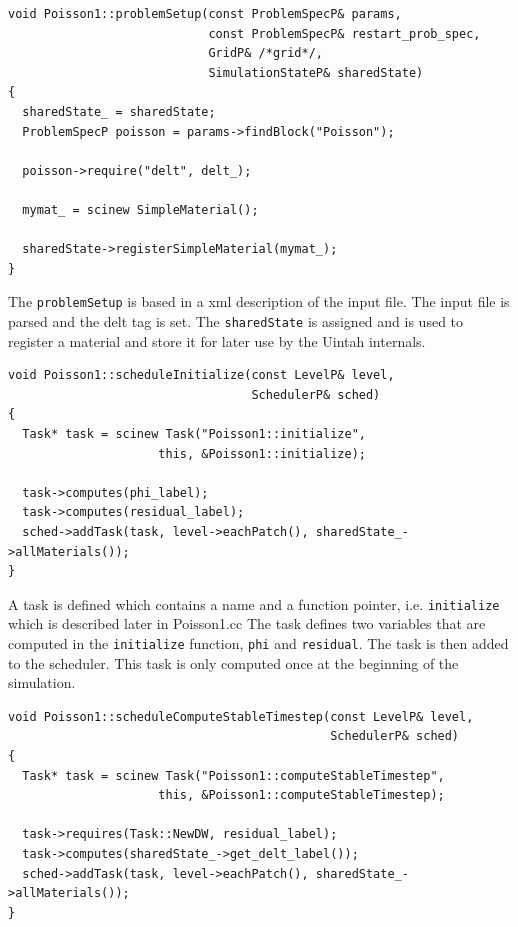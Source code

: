 \documentclass[12pt]{report}
\begin{document}
\begin{Verbatim}[fontsize=\footnotesize]
void Poisson1::problemSetup(const ProblemSpecP& params,
                            const ProblemSpecP& restart_prob_spec,
                            GridP& /*grid*/,
                            SimulationStateP& sharedState)
{
  sharedState_ = sharedState;
  ProblemSpecP poisson = params->findBlock("Poisson");

  poisson->require("delt", delt_);

  mymat_ = scinew SimpleMaterial();

  sharedState->registerSimpleMaterial(mymat_);
}
\end{Verbatim}

The \texttt{problemSetup} is based in a xml description of the input
file.  The input file is parsed and the delt tag is set.  The
\texttt{sharedState} is assigned and is used to register a material
and store it for later use by the Uintah internals.

\begin{Verbatim}[fontsize=\footnotesize]
void Poisson1::scheduleInitialize(const LevelP& level,
                                  SchedulerP& sched)
{
  Task* task = scinew Task("Poisson1::initialize",
                     this, &Poisson1::initialize);

  task->computes(phi_label);
  task->computes(residual_label);
  sched->addTask(task, level->eachPatch(), sharedState_->allMaterials());
}
\end{Verbatim}

A task is defined which contains a name and a function pointer,
i.e. \texttt{initialize} which is described later in Poisson1.cc The
task defines two variables that are computed in the
\texttt{initialize} function, \texttt{phi} and \texttt{residual}.  The
task is then added to the scheduler.  This task is only computed once
at the beginning of the simulation.

\begin{Verbatim}[fontsize=\footnotesize]
void Poisson1::scheduleComputeStableTimestep(const LevelP& level,
                                             SchedulerP& sched)
{
  Task* task = scinew Task("Poisson1::computeStableTimestep",
                     this, &Poisson1::computeStableTimestep);

  task->requires(Task::NewDW, residual_label);
  task->computes(sharedState_->get_delt_label());
  sched->addTask(task, level->eachPatch(), sharedState_->allMaterials());
}

\end{Verbatim}
\end{document}
